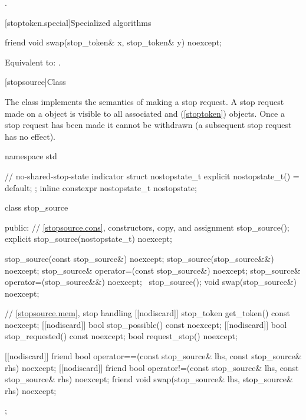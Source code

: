 \begin{itemdescr}
\pnum
\returns {}.
\end{itemdescr}

[stoptoken.special]{Specialized algorithms}

%
\begin{itemdecl}
friend void swap(stop_token& x, stop_token& y) noexcept;
\end{itemdecl}

\begin{itemdescr}
\pnum
\effects Equivalent to: .
\end{itemdescr}

%
[stopsource]{Class }

\pnum
{}%
The class  implements the semantics of making a stop request.
A stop request made on a  object is visible to all
associated  and  (\ref{stoptoken}) objects.
Once a stop request has been made it cannot be withdrawn
(a subsequent stop request has no effect).

%
%

\begin{codeblock}
namespace std {
  // no-shared-stop-state indicator
  struct nostopstate_t {
    explicit nostopstate_t() = default;
  };
  inline constexpr nostopstate_t nostopstate{};

  class stop_source {
  public:
    // \ref{stopsource.cons}, constructors, copy, and assignment
    stop_source();
    explicit stop_source(nostopstate_t) noexcept;

    stop_source(const stop_source&) noexcept;
    stop_source(stop_source&&) noexcept;
    stop_source& operator=(const stop_source&) noexcept;
    stop_source& operator=(stop_source&&) noexcept;
    ~stop_source();
    void swap(stop_source&) noexcept;

    // \ref{stopsource.mem}, stop handling
    [[nodiscard]] stop_token get_token() const noexcept;
    [[nodiscard]] bool stop_possible() const noexcept;
    [[nodiscard]] bool stop_requested() const noexcept;
    bool request_stop() noexcept;

    [[nodiscard]] friend bool
    operator==(const stop_source& lhs, const stop_source& rhs) noexcept;
    [[nodiscard]] friend bool
    operator!=(const stop_source& lhs, const stop_source& rhs) noexcept;
    friend void swap(stop_source& lhs, stop_source& rhs) noexcept;
  };
}
\end{codeblock}

